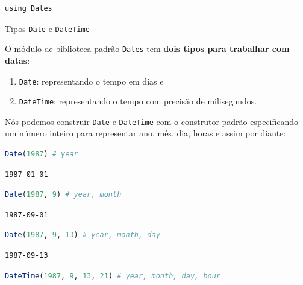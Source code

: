 \documentclass[
  notoc %
]{tufte-book}
\makeatletter
\providecommand{\tightlist}{%
  \setlength{\itemsep}{0pt}\setlength{\parskip}{0pt}
}
\newcommand{\passthrough}[1]{#1}
\renewcommand\subsubsection{%
\@startsection{subsubsection}{3}{\z@ }{-3.25ex\@plus -1ex \@minus -.2ex}{1.5ex \@plus .2ex}{\normalfont \normalsize \bfseries }
}
\makeatother
\begin{document}
\begin{lstlisting}
using Dates
\end{lstlisting}

\hypertarget{sec:dates_types}{%
\subsubsection{\texorpdfstring{Tipos \texttt{Date} e
\texttt{DateTime}}{Tipos Date e DateTime}}\label{sec:dates_types}}

O módulo de biblioteca padrão \passthrough{\lstinline!Dates!} tem
\textbf{dois tipos para trabalhar com datas}:

\begin{enumerate}
\def\labelenumi{\arabic{enumi}.}
\tightlist
\item
  \passthrough{\lstinline!Date!}: representando o tempo em dias e
\item
  \passthrough{\lstinline!DateTime!}: representando o tempo com precisão
  de milisegundos.
\end{enumerate}

Nós podemos construir \passthrough{\lstinline!Date!} e
\passthrough{\lstinline!DateTime!} com o construtor padrão especificando
um número inteiro para representar ano, mês, dia, horas e assim por
diante:

\begin{lstlisting}[language=Julia]
Date(1987) # year
\end{lstlisting}

\begin{lstlisting}[language=Output]
1987-01-01
\end{lstlisting}

\begin{lstlisting}[language=Julia]
Date(1987, 9) # year, month
\end{lstlisting}

\begin{lstlisting}[language=Output]
1987-09-01
\end{lstlisting}

\begin{lstlisting}[language=Julia]
Date(1987, 9, 13) # year, month, day
\end{lstlisting}

\begin{lstlisting}[language=Output]
1987-09-13
\end{lstlisting}

\begin{lstlisting}[language=Julia]
DateTime(1987, 9, 13, 21) # year, month, day, hour
\end{lstlisting}
\end{document}
